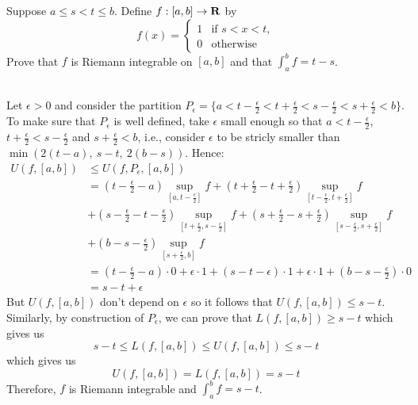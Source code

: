 \begin{exercise}
    Suppose $a \leq s < t \leq b$. Define $f:[a,b] \to \mathbf{R}$ by
    $$f(x) = \begin{cases}
        1 & \text{if } s < x < t, \\
        0 & \text{otherwise}
    \end{cases}$$
    Prove that $f$ is Riemann integrable on $[a,b]$ and that $\int_{a}^{b}f = t-s$. \\
\end{exercise}

\begin{solution}
    \\ Let $\epsilon > 0$ and consider the partition $P_{\epsilon} = \{a < t - \frac{\epsilon}{2} < t + \frac{\epsilon}{2} < s - \frac{\epsilon}{2} < s + \frac{\epsilon}{2} < b\}$. To make sure that $P_{\epsilon}$ is well defined, take $\epsilon$ small enough so that $a < t - \frac{\epsilon}{2}$, $t + \frac{\epsilon}{2} < s - \frac{\epsilon}{2}$ and $s + \frac{\epsilon}{2} < b$, i.e., consider $\epsilon$ to be stricly smaller than $\min(2(t-a), \ s-t, \ 2(b-s))$. Hence:
    \begin{align*}
        U(f, [a,b]) &\leq U(f, P_{\epsilon}, [a,b]) \\
        &= (t - \frac{\epsilon}{2} - a)\sup_{[a, t - \frac{\epsilon}{2}]}f + (t + \frac{\epsilon}{2} - t + \frac{\epsilon}{2})\sup_{[t - \frac{\epsilon}{2}, t + \frac{\epsilon}{2}]}f \\
        &  + (s - \frac{\epsilon}{2} - t - \frac{\epsilon}{2})\sup_{[t + \frac{\epsilon}{2}, s - \frac{\epsilon}{2}]}f + (s + \frac{\epsilon}{2} - s + \frac{\epsilon}{2})\sup_{[s - \frac{\epsilon}{2}, s + \frac{\epsilon}{2}]}f \\
        & + (b - s - \frac{\epsilon}{2})\sup_{[s + \frac{\epsilon}{2}, b]}f \\
        &= (t - \frac{\epsilon}{2} - a)\cdot 0 + \epsilon \cdot 1 + (s - t - \epsilon) \cdot 1 + \epsilon \cdot 1 + (b - s - \frac{\epsilon}{2})\cdot 0 \\
        &= s - t + \epsilon
    \end{align*}
    But $U(f, [a,b])$ don't depend on $\epsilon$ so it follows that $U(f, [a,b]) \leq s- t$. Similarly, by construction of $P_{\epsilon}$, we can prove that $L(f, [a,b]) \geq s- t$ which gives us
    $$s - t \leq L(f, [a,b]) \leq U(f, [a,b]) \leq s - t$$
    which gives us
    $$U(f, [a,b]) = L(f, [a,b]) = s - t$$
    Therefore, $f$ is Riemann integrable and $\int_{a}^{b}f = s-t$. \\
\end{solution}

